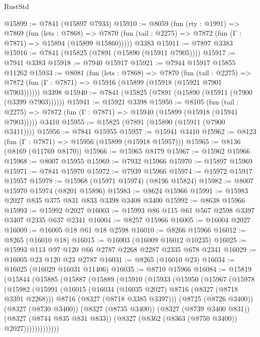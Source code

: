 \begin{lexlean}{RustStd}
\begin{coremodule}
@15899 := @7841 (@15897 @7933)
@15910 := @8059
    (fun (rty : @1991) =>
    @7869
      (fun (lets : @7868) =>
      @7870 (fun (tail : @2275) => @7872 (fun (Γ : @7871) => @15894 (@15899 @15860)))))
    @3383
@15911 := @7897 @3383
@15916 := @7841 (@15825 (@7891 (@15890 (@15911 @7905))))
@15917 := @7941 @3383
@15918 := @7940 @15917
@15921 := @7944 @15917 @15855 @11262
@15933 := @8081
    (fun (lets : @7868) =>
    @7870
      (fun (tail : @2275) =>
      @7872 (fun (Γ : @7871) => @15916 (@15899 (@15918 (@15921 @7901 @7903))))))
    @3398
@15940 := @7841 (@15825 (@7891 (@15890 (@15911 (@7900 (@3399 @7903))))))
@15941 := @15921 @3398
@15950 := @8105
    (fun (tail : @2275) => @7872 (fun (Γ : @7871) => @15940 (@15899 (@15918 (@15941 @7903)))))
    @3410
@15955 := @15825 (@7891 (@15890 (@15911 (@7900 @3411))))
@15956 := @7841 @15955
@15957 := @15941 @3410
@15962 := @8123 (fun (Γ : @7871) => @15956 (@15899 (@15918 @15957)))
@15965 := @8136 (@8169 (@11769 @8170))
@15966 := @15965 @8179
@15967 := @15962 @15966
@15968 := @8007 @15955
@15969 := @7932 @15966
@15970 := @15897 @15969
@15971 := @7841 @15970
@15972 := @7939 @15966
@15974 := @15972 @15917 @15957
@15978 := @15968 (@15971 @15974) (@8196 @15824)
@15982 := @8007 @15970 @15974 (@8201 @15896)
@15983 := @8624 @15966
@15991 := @15983 @2027 @835 @375 @831 @833 @3398 @3408 @3400
@15992 := @8638 @15966
@15993 := @15992 @2027
@16003 := @15993 @86 @115 @61 @567 @2598 @3397 @3407 @2335 @637 @2341
@16004 := @8257 @15966
@16005 := @16004 @2027
@16009 := @16005 @18 @61 @18 @2598
@16010 := @8266 @15966
@16012 := @8265 (@16010 @18)
@16015 := @16003 (@16009 @16012 @10235)
@16025 := @15993 @113 @97 @120 @66 @2787 @2268 @2287 @2335 @678 @2341
@16029 := @16005 @23 @120 @23 @2787
@16031 := @8265 (@16010 @23)
@16034 := @16025 (@16029 @16031 @11406)
@16035 := @8710 @15966
@16084 := @15819
    (@15844
      (@15885
        (@15887
          (@15889
            (@15910
              (@15933
                (@15950
                  (@15967
                    (@15978
                      (@15982
                        (@15991
                          (@16015
                            (@16034 (@16035 @2027) @8716 (@8327 (@8718 @3391 @2268)))
                            @8716
                            (@8327 (@8718 @3385 @3397)))
                          (@8725 (@8726 @3400))
                          (@8327 (@8730 @3400))
                          (@8327 (@8735 @3400))
                          (@8327 (@8739 @3400 @831))
                          (@8327 (@8744 @835 @831 @833))
                          (@8327 (@8362 (@8363 (@8750 @3400)) @2027)))))))))))))

\end{coremodule}
\end{lexlean}
